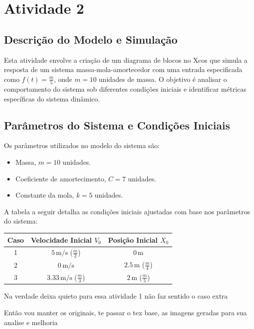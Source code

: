 \section{Atividade 2}

\subsection{Descrição do Modelo e Simulação}
Esta atividade envolve a criação de um diagrama de blocos no Xcos que simula a resposta de um sistema massa-mola-amortecedor com uma entrada especificada como \( f(t) = \frac{m}{5} \), onde \( m = 10 \) unidades de massa. O objetivo é analisar o comportamento do sistema sob diferentes condições iniciais e identificar métricas específicas do sistema dinâmico.

\subsection{Parâmetros do Sistema e Condições Iniciais}
Os parâmetros utilizados no modelo do sistema são:
\begin{itemize}
    \item Massa, \( m = 10 \) unidades.
    \item Coeficiente de amortecimento, \( C = 7 \) unidades.
    \item Constante da mola, \( k = 5 \) unidades.
\end{itemize}

A tabela a seguir detalha as condições iniciais ajustadas com base nos parâmetros do sistema:
\begin{center}
\begin{tabular}{|c|c|c|}
\hline
Caso & Velocidade Inicial \( V_0 \) & Posição Inicial \( X_0 \) \\
\hline
1 & \( 5 \, \text{m/s} \) (\( \frac{m}{2} \)) & \( 0 \, \text{m} \) \\
2 & \( 0 \, \text{m/s} \) & \( 2.5 \, \text{m} \) (\( \frac{m}{4} \)) \\
3 & \( 3.33 \, \text{m/s} \) (\( \frac{m}{3} \)) & \( 2 \, \text{m} \) (\( \frac{m}{5} \)) \\
\hline
\end{tabular}
\end{center}

Na verdade deixa quieto para essa atividade 1 não faz sentido o caso extra

Então vou manter os originais, te passar o tex base, as imagens geradas para sua analise e melhoria

